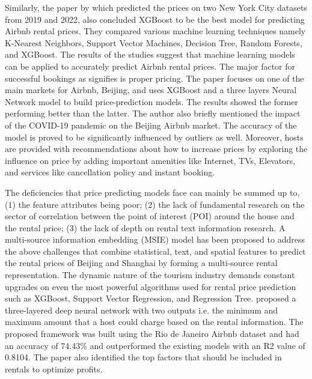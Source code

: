 \documentclass[conference]{IEEEtran}
\begin{document}
Similarly, the paper by which predicted the prices on two New York City datasets from 2019 and 2022, also concluded XGBoost to be the best model for predicting Airbnb rental prices. They compared various machine learning techniques namely K-Nearest Neighbors, Support Vector Machines, Decision Tree, Random Forests, and XGBoost. The results of the studies suggest that machine learning models can be applied to accurately predict Airbnb rental prices. The major factor for successful bookings as signifies is proper pricing. The paper focuses on one of the main markets for Airbnb, Beijing, and uses XGBoost and a three layers Neural Network model to build price-prediction models. The results showed the former performing better than the latter. The author also briefly mentioned the impact of the COVID-19 pandemic on the Beijing Airbnb market. The accuracy of the model is proved to be significantly influenced by outliers as well. Moreover, hosts are provided with recommendations about how to increase prices by exploring the influence on price by adding important amenities like Internet, TVs, Elevators, and services like cancellation policy and instant booking. \newline

The deficiencies that price predicting models face can mainly be summed up to, (1) the feature attributes being poor; (2) the lack of fundamental research on the sector of correlation between the point of interest (POI) around the house and the rental price; (3) the lack of depth on rental text information research. A multi-source information embedding (MSIE) model has been proposed to address the above challenges that combine statistical, text, and spatial features to predict the rental prices of Beijing and Shanghai by forming a multi-source rental representation. The dynamic nature of the tourism industry demands constant upgrades on even the most powerful algorithms used for rental price prediction such as XGBoost, Support Vector Regression, and Regression Tree. proposed a three-layered deep neural network with two outputs i.e. the minimum and maximum amount that a host could charge based on the rental information. The proposed framework was built using the Rio de Janeiro Airbnb dataset and had an accuracy of 74.43\% and outperformed the existing models with an R2 value of 0.8104. The paper also identified the top factors that should be included in rentals to optimize profits. \newline
\end{document}
